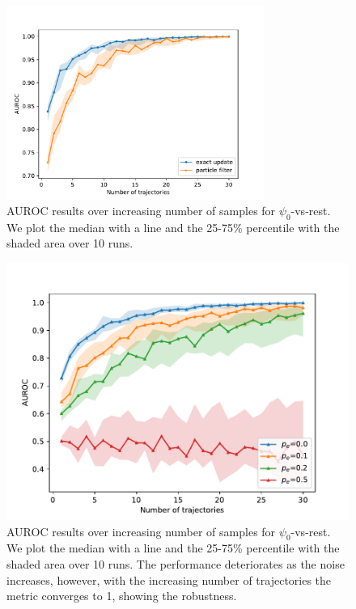 \begin{figure}[t]
	\begin{center}
		\includegraphics[width=0.75\textwidth]{figures/roc_analysis/AUROC_perc_0}
		\caption[AUROC results over increasing number of samples]{AUROC results over increasing number of samples for $ \psi_0 $-vs-rest. We plot the median with a line and the 25-75\% percentile with the shaded area over 10 runs.}
		\label{fig:AUROC_class0}
	\end{center}
\end{figure}

\begin{figure}[t]
	\begin{center}
		\includegraphics[width=.75\textwidth]{figures/roc_analysis/error_AUROC_perc_0}
		\caption[AUROC results over increasing number of samples with different error probability $ p_e $]{AUROC results over increasing number of samples for $ \psi_0 $-vs-rest. We plot the median with a line and the 25-75\% percentile with the shaded area over 10 runs. The performance deteriorates as the noise increases, however, with the increasing number of trajectories the metric converges to 1, showing the robustness.}
		\label{fig:AUROC_class0_error}
	\end{center}
\end{figure}
